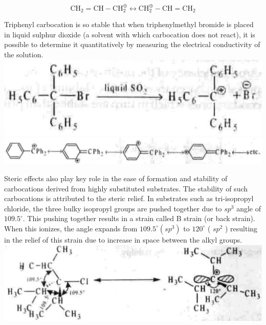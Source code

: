 \documentclass[10pt]{article}
\begin{document}
$$
\mathrm{CH}_{2}=\mathrm{CH}-\mathrm{CH}_{2}^{\oplus} \longleftrightarrow \mathrm{CH}_{2}^{\oplus}-\mathrm{CH}=\mathrm{CH}_{2}
$$



Triphenyl carbocation is so stable that when triphenylmethyl bromide is placed in liquid sulphur dioxide (a solvent with which carbocation does not react), it is possible to determine it quantitatively by measuring the electrical conductivity of the solution.\\
\includegraphics[max width=\textwidth, center]{2025_01_28_8470952b98110cec3aabg-086}\\
\includegraphics[max width=\textwidth, center]{2025_01_28_8470952b98110cec3aabg-086(1)}

Steric effects also play key role in the ease of formation and stability of carbocations derived from highly substituted substrates. The stability of such carbocations is attributed to the steric relief. In substrates such as tri-isopropyl chloride, the three bulky isopropyl groups are pushed together due to $s p^{3}$ angle of $109.5^{\circ}$. This pushing together results in a strain called B strain (or back strain). When this ionizes, the angle expands from $109.5^{\circ}\left(s p^{3}\right)$ to $120^{\circ}$ ( $s p^{2}$ ) resulting in the relief of this strain due to increase in space between the alkyl groups.\\
\includegraphics[max width=\textwidth, center]{2025_01_28_8470952b98110cec3aabg-087}
\end{document}
